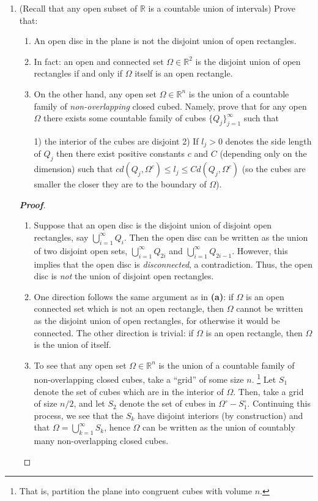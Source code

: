 \documentclass[12pt,leqno]{book}
\theoremstyle{definition}
\newcommand{\R}{\mathbb{R}}
\newenvironment{Proof}{\begin{proof}[\textnormal{\textbf{Proof}}]}{\end{proof}}
\begin{document}
\begin{enumerate}
  \item (Recall that any open subset of $\R$ is a countable union of intervals) Prove that:
    \begin{enumerate}
     \item An open disc in the plane is not the disjoint union of open rectangles.
     \item In fact: an open and connected set $\Omega\in\R^2$ is the disjoint union of open rectangles if and only if $\Omega$ itself is an open rectangle.
     \item On the other hand, any open set $\Omega\in\R^n$ is the union of a countable family of \textit{non-overlapping} closed cubed. Namely, prove that for any open $\Omega$ there exists some countable family of cubes $\{Q_j\}_{j=1}^{\infty}$ such that 

     1) the interior of the cubes are disjoint
     2) If $l_j>0$ denotes the side length of $Q_j$ then there exist positive constants $c$ and $C$ (depending only on the dimension) such that $cd(Q_j,\Omega^c)\leq l_j\leq Cd(Q_j,\Omega^c)$ (so the cubes are smaller the closer they are to the boundary of $\Omega$).
    \end{enumerate}
  \begin{Proof}
   \begin{enumerate}
    \item Suppose that an open disc is the disjoint union of disjoint open rectangles, say $\bigcup_{i=1}^{\infty}Q_i$. Then the open disc can be written as the union of two disjoint open sets, $\bigcup_{i=1}^{\infty}Q_{2i}$ and $\bigcup_{i=1}^{\infty}Q_{2i-1}$. However, this implies that the open disc is \textit{disconnected}, a contradiction. Thus, the open disc is \textit{not} the union of disjoint open rectangles.
    \item One direction follows the same argument as in \textbf{(a)}: if $\Omega$ is an open connected set which is not an open rectangle, then $\Omega$ cannot be written as the disjoint union of open rectangles, for otherwise it would be connected. The other direction is trivial: if $\Omega$ is an open rectangle, then $\Omega$ is the union of itself.
    \item To see that any open set $\Omega\in\R^n$ is the union of a countable family of non-overlapping closed cubes, take a ``grid'' of some size $n$. \footnote{That is, partition the plane into congruent cubes with volume $n$.} Let $S_1$ denote the set of cubes which are in the interior of $\Omega$. Then, take a grid of size $n/2$, and let $S_2$ denote the set of cubes in $\Omega^{\circ}-S_1^{\circ}$. Continuing this process, we see that the $S_k$ have disjoint interiors (by construction) and that $\Omega=\bigcup_{k=1}^{\infty}S_k$, hence $\Omega$ can be written as the union of countably many non-overlapping closed cubes. 
   \end{enumerate}


\end{Proof}
\end{enumerate}
\end{document}
